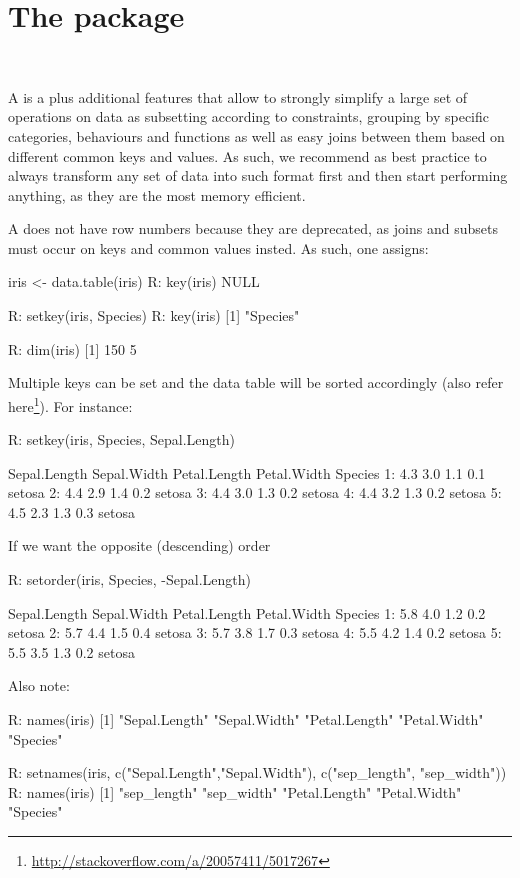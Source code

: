 \section{The  package}\label{sec: datatable}
\\
\bigskip 

A  is a \df plus
additional features that allow to strongly simplify
a large set of operations on data as subsetting 
according to constraints, grouping by specific
categories, behaviours and functions as well as
easy joins between them based on different 
common keys and values. As such, we recommend as
best practice to always transform any set of data
into such format first and then start performing
anything, as they are the most memory efficient.
\bigskip 

A  does not have row numbers
because they are deprecated, as joins and subsets
must occur on keys and common values insted.
As such, one assigns:
\begin{example}
iris <- data.table(iris)
R: key(iris)
NULL

R: setkey(iris, Species)
R: key(iris)
[1] "Species"

R: dim(iris)
[1] 150   5
\end{example}
Multiple keys can be set and the data table 
will be sorted accordingly (also refer 
here\footnote{ 
\url{http://stackoverflow.com/a/20057411/5017267}
}). For instance:
\begin{example}
R: setkey(iris, Species, Sepal.Length) 

     Sepal.Length Sepal.Width Petal.Length Petal.Width   Species
  1:          4.3         3.0          1.1         0.1    setosa
  2:          4.4         2.9          1.4         0.2    setosa
  3:          4.4         3.0          1.3         0.2    setosa
  4:          4.4         3.2          1.3         0.2    setosa
  5:          4.5         2.3          1.3         0.3    setosa
\end{example}
If we want the opposite (descending) order
\begin{example}
R: setorder(iris, Species, -Sepal.Length)

     Sepal.Length Sepal.Width Petal.Length Petal.Width   Species
  1:          5.8         4.0          1.2         0.2    setosa
  2:          5.7         4.4          1.5         0.4    setosa
  3:          5.7         3.8          1.7         0.3    setosa
  4:          5.5         4.2          1.4         0.2    setosa
  5:          5.5         3.5          1.3         0.2    setosa
\end{example}
Also note:
\begin{example}
R: names(iris)
[1] "Sepal.Length" "Sepal.Width"  "Petal.Length" 
	"Petal.Width"  "Species"

R: setnames(iris, c("Sepal.Length","Sepal.Width"), 
		  c("sep_length", "sep_width"))
R: names(iris)
[1] "sep_length"   "sep_width"    "Petal.Length" 
		"Petal.Width"  "Species" 
\end{example}

